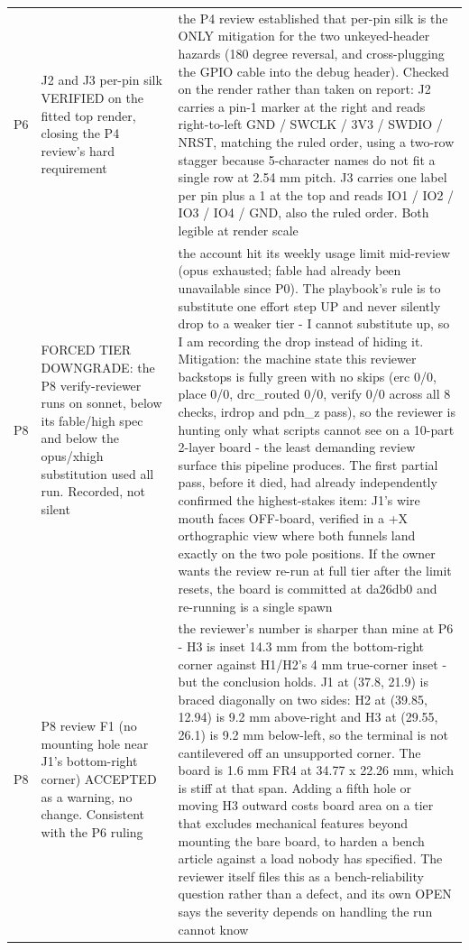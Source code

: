 \documentclass[11pt,a4paper]{article}
\begin{document}
{\begin{longtable}{lp{5.2cm}p{7.2cm}}
P6 & J2 and J3 per-pin silk VERIFIED on the fitted top render, closing the P4 review's hard requirement & the P4 review established that per-pin silk is the ONLY mitigation for the two unkeyed-header hazards (180 degree reversal, and cross-plugging the GPIO cable into the debug header). Checked on the render rather than taken on report: J2 carries a pin-1 marker at the right and reads right-to-left GND / SWCLK / 3V3 / SWDIO / NRST, matching the ruled order, using a two-row stagger because 5-character names do not fit a single row at 2.54 mm pitch. J3 carries one label per pin plus a 1 at the top and reads IO1 / IO2 / IO3 / IO4 / GND, also the ruled order. Both legible at render scale \\
P8 & FORCED TIER DOWNGRADE: the P8 verify-reviewer runs on sonnet, below its fable/high spec and below the opus/xhigh substitution used all run. Recorded, not silent & the account hit its weekly usage limit mid-review (opus exhausted; fable had already been unavailable since P0). The playbook's rule is to substitute one effort step UP and never silently drop to a weaker tier - I cannot substitute up, so I am recording the drop instead of hiding it. Mitigation: the machine state this reviewer backstops is fully green with no skips (erc 0/0, place 0/0, drc\_routed 0/0, verify 0/0 across all 8 checks, irdrop and pdn\_z pass), so the reviewer is hunting only what scripts cannot see on a 10-part 2-layer board - the least demanding review surface this pipeline produces. The first partial pass, before it died, had already independently confirmed the highest-stakes item: J1's wire mouth faces OFF-board, verified in a +X orthographic view where both funnels land exactly on the two pole positions. If the owner wants the review re-run at full tier after the limit resets, the board is committed at da26db0 and re-running is a single spawn \\
P8 & P8 review F1 (no mounting hole near J1's bottom-right corner) ACCEPTED as a warning, no change. Consistent with the P6 ruling & the reviewer's number is sharper than mine at P6 - H3 is inset 14.3 mm from the bottom-right corner against H1/H2's 4 mm true-corner inset - but the conclusion holds. J1 at (37.8, 21.9) is braced diagonally on two sides: H2 at (39.85, 12.94) is 9.2 mm above-right and H3 at (29.55, 26.1) is 9.2 mm below-left, so the terminal is not cantilevered off an unsupported corner. The board is 1.6 mm FR4 at 34.77 x 22.26 mm, which is stiff at that span. Adding a fifth hole or moving H3 outward costs board area on a tier that excludes mechanical features beyond mounting the bare board, to harden a bench article against a load nobody has specified. The reviewer itself files this as a bench-reliability question rather than a defect, and its own OPEN says the severity depends on handling the run cannot know \\

\end{longtable}}
\end{document}
